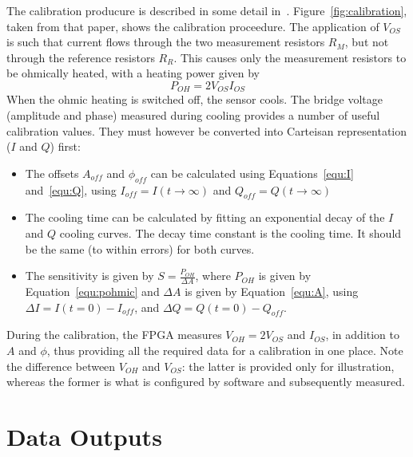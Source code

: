 \documentclass[12pt,a4paper]{article}
\begin{document}
The calibration producure is described in some detail in~\cite{lovell-2015}. Figure~\ref{fig:calibration}, taken from that paper, shows the calibration
proceedure. The application of $V_{OS}$ is such that current flows through the two measurement resistors $R_M$, but not through the reference resistors
$R_R$. This causes only the measurement resistors to be ohmically heated, with a heating power given by
\begin{equation}
  \label{equ:pohmic}
  P_{OH} = 2 V_{OS} I_{OS}
\end{equation}
When the ohmic heating is switched off, the sensor cools. The bridge voltage (amplitude and phase) measured during cooling provides a number of useful
calibration values. They must however be converted into Carteisan representation ($I$ and $Q$) first:
\begin{itemize}
\item{The offsets $A_{off}$ and $\phi_{off}$ can be calculated using Equations~\ref{equ:I} and~\ref{equ:Q}, using $I_{off} = I(t\rightarrow\infty)$ and $Q_{off}
    = Q(t\rightarrow\infty)$}
\item{The cooling time can be calculated by fitting an exponential decay of the $I$ and $Q$ cooling curves. The decay time constant is the cooling time.
    It should be the same (to within errors) for both curves.}
\item{The sensitivity is given by $S = \frac{P_{OH}}{\Delta A}$, where $P_{OH}$ is given by Equation~\ref{equ:pohmic} and $\Delta A$ is given by
    Equation~\ref{equ:A}, using $\Delta I = I(t=0) - I_{off}$, and $\Delta Q = Q(t=0) - Q_{off}$.}
\end{itemize}
During the calibration, the FPGA measures $V_{OH} = 2V_{OS}$ and $I_{OS}$, in addition to $A$ and $\phi$, thus providing all the required data for a
calibration in one place. Note the difference between $V_{OH}$ and $V_{OS}$: the latter is provided only for illustration, whereas the former is what is
configured by software and subsequently measured.

\section{Data Outputs}
\label{sec:outputs}
\end{document}
